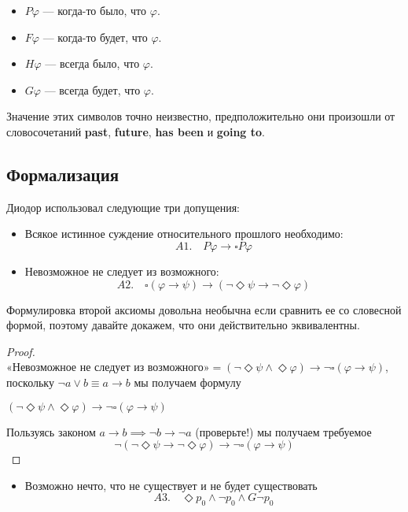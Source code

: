 \documentclass[openany]{book}
\theoremstyle{plain}
\theoremstyle{definition}
\begin{document}
\begin{itemize}
    \item \(P\varphi\) — когда-то было, что \(\varphi\).
    \item \(F\varphi\) — когда-то будет, что \(\varphi\).
    \item \(H\varphi\) — всегда было, что \(\varphi\).
    \item \(G\varphi\) — всегда будет, что \(\varphi\).
\end{itemize}

Значение этих символов точно неизвестно, предположительно они произошли от словосочетаний \textbf{past}, \textbf{future}, \textbf{has been} и \textbf{going to}. 

\subsection{Формализация}

Диодор использовал следующие три допущения:

\begin{itemize}
    \item Всякое истинное суждение относительного прошлого необходимо:
	\[A1. \quad P\varphi \to \square P\varphi \]
    \item Невозможное не следует из возможного:
	\[A2. \quad \square(\varphi \to \psi) \to (\neg \Diamond \psi \to \neg \Diamond \varphi)\]
\end{itemize}

Формулировка второй аксиомы довольна необычна если сравнить ее со словесной формой, поэтому давайте докажем, что они действительно эквивалентны.
\begin{proof}

    \(\text{«Невозможное не следует из возможного»} = (\neg \Diamond \psi \land \Diamond \varphi) \to \neg \square (\varphi \to \psi)\), поскольку \(\neg a \lor b \equiv a \to b\) мы получаем формулу

    \((\neg \Diamond \psi \land \Diamond \varphi) \to \neg \square (\varphi \to \psi)\)

    Пользуясь законом \(a \to b \implies \neg b \to \neg a\) (проверьте!) мы получаем требуемое
    \[\neg(\neg \Diamond \psi \to \neg \Diamond \varphi) \to \neg \square (\varphi \to \psi)\]
\end{proof}
\begin{itemize}
    \item Возможно нечто, что не существует и не будет существовать
	\[A3. \quad \Diamond p_0 \land \neg p_0 \land G\neg p_0\]
\end{itemize}
\end{document}
